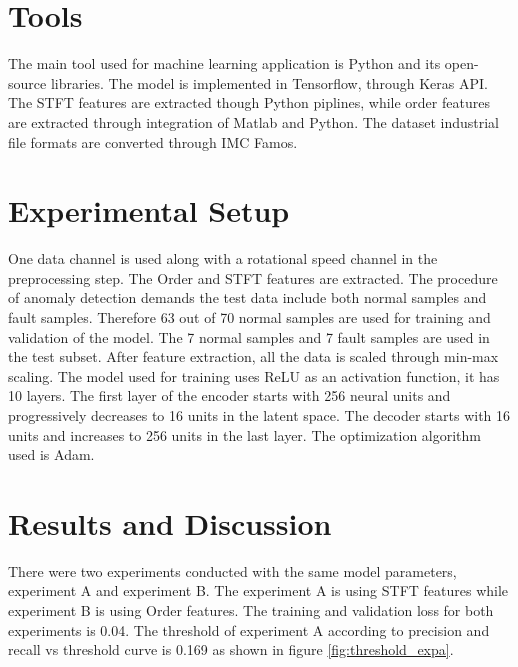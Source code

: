 \documentclass[conference]{IEEEtran}
\begin{document}
\section{Tools}
The main tool used for machine learning application is Python and its open-source libraries. The model is implemented in Tensorflow, through Keras API. The STFT features are extracted though Python piplines, while order features are extracted through integration of Matlab and Python. The dataset industrial file formats are converted through IMC Famos.   

\section{Experimental Setup}

One data channel is used along with a rotational speed channel in the preprocessing step. The Order and STFT features are extracted. The procedure of anomaly detection demands the test data include both normal samples and fault samples. Therefore 63 out of 70 normal samples are used for training and validation of the model. The 7 normal samples and 7 fault samples are used in the test subset. After feature extraction, all the data is scaled through min-max scaling. The model used for training uses ReLU as an activation function, it has 10 layers. The first layer of the encoder starts with 256 neural units and progressively decreases to 16 units in the latent space. The decoder starts with 16 units and increases to 256 units in the last layer. The optimization algorithm used is Adam.

\section{Results and Discussion}
There were two experiments conducted with the same model parameters, experiment A and experiment B. The experiment A is using STFT features while experiment B is using Order features. The training and validation loss for both experiments is 0.04. The threshold of experiment A according to precision and recall vs threshold curve is 0.169 as shown in figure \ref{fig:threshold_expa}.
\end{document}
